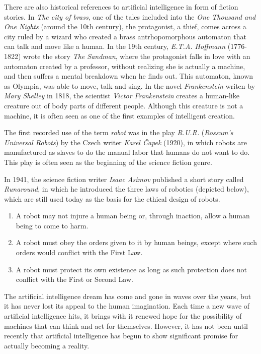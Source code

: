 There are also historical references to artificial intelligence in form of fiction stories. In \textit{The city of brass}, one of the tales included into the \textit{One Thousand and One Nights} (around the 10th century), the protagonist, a thief, comes across a city ruled by a wizard who created a brass antrhopomorphous automaton that can talk and move like a human. In the 19th century, \textit{E.T.A. Hoffmann} (1776-1822) wrote the story \textit{The Sandman}, where the protagonist falls in love with an automaton created by a professor, without realizing she is actually a machine, and then suffers a mental breakdown when he finds out. This automaton, known as Olympia, was able to move, talk and sing. In the novel \textit{Frankenstein} writen by \textit{Mary Shelley} in 1818, the scientist \textit{Victor Frankenstein} creates a human-like creature out of body parts of different people. Although this creature is not a machine, it is often seen as one of the first examples of intelligent creation.

The first recorded use of the term \textit{robot} was in the play \textit{R.U.R.} (\textit{Rossum’s Universal Robots}) by the Czech writer \textit{Karel Čapek} (1920), in which robots are manufactured as slaves to do the manual labor that humans do not want to do. This play is often seen as the beginning of the science fiction genre.

In 1941, the science fiction writer \textit{Isaac Asimov} published a short story called \textit{Runaround}, in which he introduced the three laws of robotics (depicted below), which are still used today as the basis for the ethical design of robots.


\begin{enumerate}

	\item A robot may not injure a human being or, through inaction, allow a human being to come to harm.

	\item A robot must obey the orders given to it by human beings, except where such orders would conflict with the First Law.

	\item A robot must protect its own existence as long as such protection does not conflict with the First or Second Law.

\end{enumerate}

The artificial intelligence dream has come and gone in waves over the years, but it has never lost its appeal to the human imagination. Each time a new wave of artificial intelligence hits, it brings with it renewed hope for the possibility of machines that can think and act for themselves. However, it has not been until recently that artificial intelligence has begun to show significant promise for actually becoming a reality.

